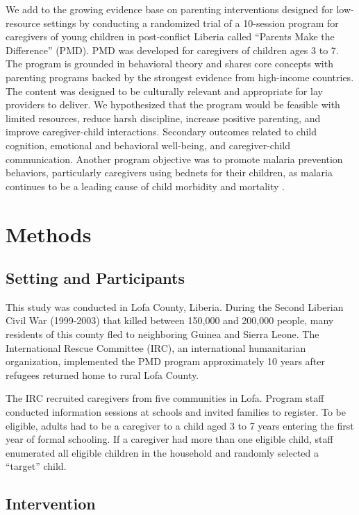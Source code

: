 \documentclass[12pt,authoryear]{elsarticle}\usepackage{knitr}
\begin{document}
We add to the growing evidence base on parenting interventions designed for low-resource settings by conducting a randomized trial of a 10-session program for caregivers of young children in post-conflict Liberia called ``Parents Make the Difference'' (PMD). PMD was developed for caregivers of children ages 3 to 7. The program is grounded in behavioral theory and shares core concepts with parenting programs backed by the strongest evidence from high-income countries. The content was designed to be culturally relevant and appropriate for lay providers to deliver. We hypothesized that the program would be feasible with limited resources, reduce harsh discipline, increase positive parenting, and improve caregiver-child interactions. Secondary outcomes related to child cognition, emotional and behavioral well-being, and caregiver-child communication. Another program objective was to promote malaria prevention behaviors, particularly caregivers using bednets for their children, as malaria continues to be a leading cause of child morbidity and mortality \citep{libmics:2011}. 

\section*{Methods}

\subsection*{Setting and Participants}

This study was conducted in Lofa County, Liberia. During the Second Liberian Civil War (1999-2003) that killed between 150,000 and 200,000 people, many residents of this county fled to neighboring Guinea and Sierra Leone. The International Rescue Committee (IRC), an international humanitarian organization, implemented the PMD program approximately 10 years after refugees returned home to rural Lofa County. 

The IRC recruited caregivers from five communities in Lofa. Program staff conducted information sessions at schools and invited families to register. To be eligible, adults had to be a caregiver to a child aged 3 to 7 years entering the first year of formal schooling. If a caregiver had more than one eligible child, staff enumerated all eligible children in the household and randomly selected a ``target'' child.

\subsection*{Intervention}
\end{document}
